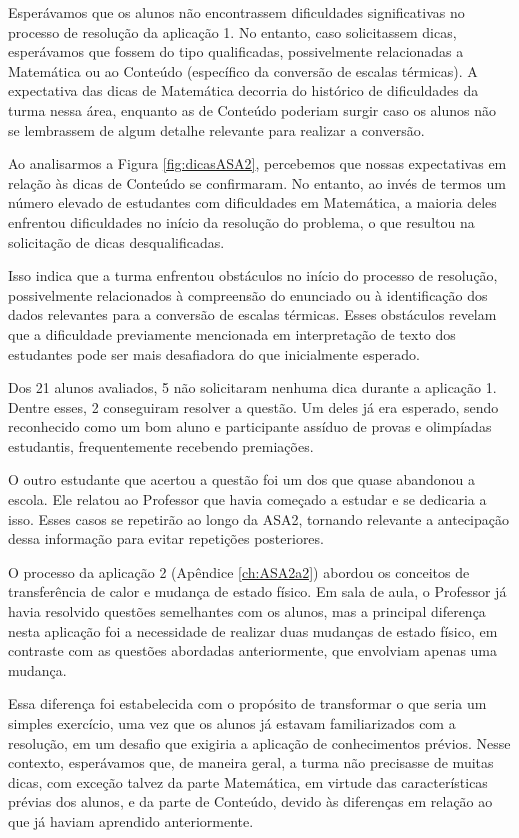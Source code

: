 Esperávamos que os alunos não encontrassem dificuldades significativas no processo de resolução da aplicação 1. No entanto, caso solicitassem dicas, esperávamos que fossem do tipo qualificadas, possivelmente relacionadas a Matemática ou ao Conteúdo (específico da conversão de escalas térmicas). A expectativa das dicas de Matemática decorria do histórico de dificuldades da turma nessa área, enquanto as de Conteúdo poderiam surgir caso os alunos não se lembrassem de algum detalhe relevante para realizar a conversão.

Ao analisarmos a Figura \ref{fig:dicasASA2}, percebemos que nossas expectativas em relação às dicas de Conteúdo se confirmaram. No entanto, ao invés de termos um número elevado de estudantes com dificuldades em Matemática, a maioria deles enfrentou dificuldades no início da resolução do problema, o que resultou na solicitação de dicas desqualificadas. 

Isso indica que a turma enfrentou obstáculos no início do processo de resolução, possivelmente relacionados à compreensão do enunciado ou à identificação dos dados relevantes para a conversão de escalas térmicas. Esses obstáculos revelam que a dificuldade previamente mencionada em interpretação de texto dos estudantes pode ser mais desafiadora do que inicialmente esperado.

Dos 21 alunos avaliados, 5 não solicitaram nenhuma dica durante a aplicação 1. Dentre esses, 2 conseguiram resolver a questão. Um deles já era esperado, sendo reconhecido como um bom aluno e participante assíduo de provas e olimpíadas estudantis, frequentemente recebendo premiações.

O outro estudante que acertou a questão foi um dos que quase abandonou a escola. Ele relatou ao Professor que havia começado a estudar e se dedicaria a isso. Esses casos se repetirão ao longo da ASA2, tornando relevante a antecipação dessa informação para evitar repetições posteriores.

O processo da aplicação 2 (Apêndice \ref{ch:ASA2a2}) abordou os conceitos de transferência de calor e mudança de estado físico. Em sala de aula, o Professor já havia resolvido questões semelhantes com os alunos, mas a principal diferença nesta aplicação foi a necessidade de realizar duas mudanças de estado físico, em contraste com as questões abordadas anteriormente, que envolviam apenas uma mudança.

Essa diferença foi estabelecida com o propósito de transformar o que seria um simples exercício, uma vez que os alunos já estavam familiarizados com a resolução, em um desafio que exigiria a aplicação de conhecimentos prévios. Nesse contexto, esperávamos que, de maneira geral, a turma não precisasse de muitas dicas, com exceção talvez da parte Matemática, em virtude das características prévias dos alunos, e da parte de Conteúdo, devido às diferenças em relação ao que já haviam aprendido anteriormente.

